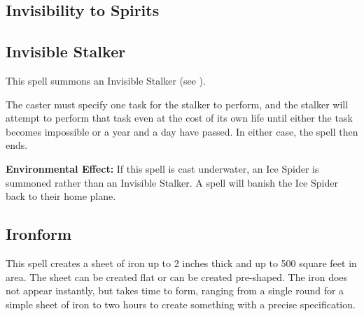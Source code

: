 \begin{multicols*}{2}
\subsection{Invisibility to Spirits}\label{spell:Invisibility to Spirits}


\subsection{Invisible Stalker}\label{spell:Invisible Stalker}

This spell summons an Invisible Stalker (see ).

The caster must specify one task for the stalker to perform, and the stalker will attempt to perform that task even at the cost of its own life until either the task becomes impossible or a year and a day have passed. In either case, the spell then ends.

\textbf{Environmental Effect:} If this spell is cast underwater, an Ice Spider is summoned rather than an Invisible Stalker. A  spell will banish the Ice Spider back to their home plane.

\subsection{Ironform}\label{spell:Ironform}


This spell creates a sheet of iron up to 2 inches thick and up to 500 square feet in area. The sheet can be created flat or can be created pre-shaped. The iron does not appear instantly, but takes time to form, ranging from a single round for a simple sheet of iron to two hours to create something with a precise specification.


\end{multicols*}
